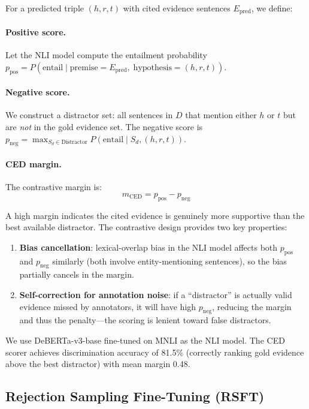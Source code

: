 \documentclass[11pt,a4paper]{article}
\newcommand{\rsft}{RSFT}
\begin{document}
For a predicted triple $(h, r, t)$ with cited evidence sentences $E_\text{pred}$, we define:

\paragraph{Positive score.} Let the NLI model compute the entailment probability $p_\text{pos} = P(\text{entail} \mid \text{premise}=E_\text{pred},\; \text{hypothesis}=(h, r, t))$.

\paragraph{Negative score.} We construct a distractor set: all sentences in $D$ that mention either $h$ or $t$ but are \emph{not} in the gold evidence set. The negative score is $p_\text{neg} = \max_{S_d \in \text{Distractor}} P(\text{entail} \mid S_d, (h, r, t))$.

\paragraph{CED margin.} The contrastive margin is:
\begin{equation}
m_\text{CED} = p_\text{pos} - p_\text{neg}
\end{equation}

A high margin indicates the cited evidence is genuinely more supportive than the best available distractor. The contrastive design provides two key properties:
\begin{enumerate}[nosep,leftmargin=*]
\item \textbf{Bias cancellation}: lexical-overlap bias in the NLI model affects both $p_\text{pos}$ and $p_\text{neg}$ similarly (both involve entity-mentioning sentences), so the bias partially cancels in the margin.
\item \textbf{Self-correction for annotation noise}: if a ``distractor'' is actually valid evidence missed by annotators, it will have high $p_\text{neg}$, reducing the margin and thus the penalty---the scoring is lenient toward false distractors.
\end{enumerate}

We use DeBERTa-v3-base fine-tuned on MNLI as the NLI model. The CED scorer achieves discrimination accuracy of 81.5\% (correctly ranking gold evidence above the best distractor) with mean margin 0.48.

\subsection{Rejection Sampling Fine-Tuning (\rsft{})}
\label{sec:rsft}
\end{document}
